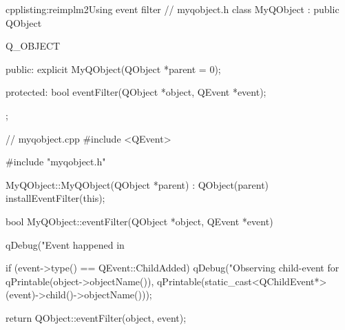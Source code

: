 \begin{fdoccode}{cpp}{listing:reimplm2}{Using event filter}
// myqobject.h
class MyQObject : public QObject {
	Q_OBJECT

    public:
		explicit MyQObject(QObject *parent = 0);

    protected:
		bool eventFilter(QObject *object, QEvent *event);
};

// myqobject.cpp
#include <QEvent>

#include "myqobject.h"


MyQObject::MyQObject(QObject *parent) : QObject(parent) {
    installEventFilter(this);
}

bool MyQObject::eventFilter(QObject *object, QEvent *event) {
    qDebug("Event happened in %

    if (event->type() == QEvent::ChildAdded) {
	qDebug("Observing child-event for %
	       qPrintable(object->objectName()),
	       qPrintable(static_cast<QChildEvent*>(event)->child()->objectName()));
    }

    return QObject::eventFilter(object, event);
}
\end{fdoccode}



